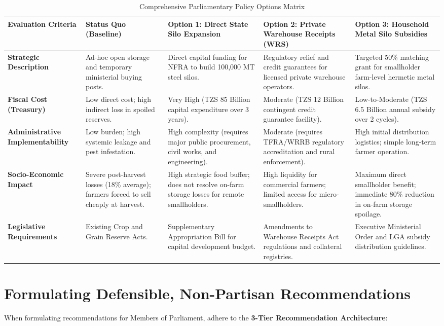 \documentclass[11pt, a4paper]{report}
\begin{document}
\begin{table}[htbp]
\centering
\caption{Comprehensive Parliamentary Policy Options Matrix}
\vspace{0.2cm}
\begin{tabular}{@{}>{\bfseries}p{2.8cm}p{3cm}p{3cm}p{3cm}p{3cm}@{}}
\toprule
Evaluation Criteria & Status Quo (Baseline) & Option 1: Direct State Silo Expansion & Option 2: Private Warehouse Receipts (WRS) & Option 3: Household Metal Silo Subsidies \\
\midrule
Strategic Description & Ad-hoc open storage and temporary ministerial buying posts. & Direct capital funding for NFRA to build 100,000 MT steel silos. & Regulatory relief and credit guarantees for licensed private warehouse operators. & Targeted 50\% matching grant for smallholder farm-level hermetic metal silos. \\
\addlinespace
Fiscal Cost (Treasury) & Low direct cost; high indirect loss in spoiled reserves. & Very High (TZS 85 Billion capital expenditure over 3 years). & Moderate (TZS 12 Billion contingent credit guarantee facility). & Low-to-Moderate (TZS 6.5 Billion annual subsidy over 2 cycles). \\
\addlinespace
Administrative Implementability & Low burden; high systemic leakage and pest infestation. & High complexity (requires major public procurement, civil works, and engineering). & Moderate (requires TFRA/WRRB regulatory accreditation and rural enforcement). & High initial distribution logistics; simple long-term farmer operation. \\
\addlinespace
Socio-Economic Impact & Severe post-harvest losses (18\% average); farmers forced to sell cheaply at harvest. & High strategic food buffer; does not resolve on-farm storage losses for remote smallholders. & High liquidity for commercial farmers; limited access for micro-smallholders. & Maximum direct smallholder benefit; immediate 80\% reduction in on-farm storage spoilage. \\
\addlinespace
Legislative Requirements & Existing Crop and Grain Reserve Acts. & Supplementary Appropriation Bill for capital development budget. & Amendments to Warehouse Receipts Act regulations and collateral registries. & Executive Ministerial Order and LGA subsidy distribution guidelines. \\
\bottomrule
\end{tabular}
\end{table}

\section{Formulating Defensible, Non-Partisan Recommendations}
When formulating recommendations for Members of Parliament, adhere to the \textcolor{suagreen}{\textbf{3-Tier Recommendation Architecture}}:
\end{document}
